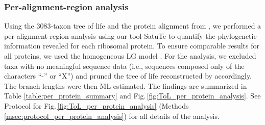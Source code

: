 \begin{appendices}
\bigskip

\subsubsection{Per-alignment-region analysis}\label{suppsec:2DT_per_region_analysis}

Using the $3083$-taxon tree of life and the protein alignment from , we performed a per-alignment-region analysis using our tool SatuTe to quantify the phylogenetic information revealed for each ribosomal protein. To ensure comparable results for all proteins, we used the homogeneous LG model . For the analysis, we excluded taxa with no meaningful sequence data (i.e., sequences composed only of the characters “-” or “X”) and pruned the tree of life reconstructed by  accordingly. The branch lengths were then ML-estimated. The findings are summarized in Table \ref{table:per_protein_summary} and Fig.\,\ref{fig:ToL_per_protein_analysis}. See Protocol for Fig.\,\ref{fig:ToL_per_protein_analysis} (Methods  \ref{msec:protocol_per_protein_analysis}) for all details of the analysis.


\end{appendices}

